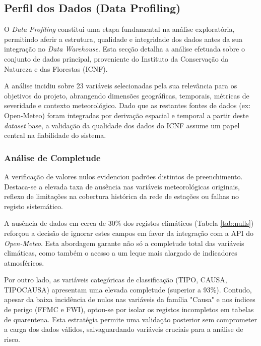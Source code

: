 \subsection{Perfil dos Dados (Data Profiling)}
\label{subsec:data_profiling}

O \textit{Data Profiling} constitui uma etapa fundamental na análise exploratória, permitindo aferir a estrutura, qualidade e integridade dos dados antes da sua integração no \textit{Data Warehouse}. Esta secção detalha a análise efetuada sobre o conjunto de dados principal, proveniente do Instituto da Conservação da Natureza e das Florestas (ICNF).

A análise incidiu sobre 23 variáveis selecionadas pela sua relevância para os objetivos do projeto, abrangendo dimensões geográficas, temporais, métricas de severidade e contexto meteorológico. Dado que as restantes fontes de dados (ex: Open-Meteo) foram integradas por derivação espacial e temporal a partir deste \textit{dataset} base, a validação da qualidade dos dados do ICNF assume um papel central na fiabilidade do sistema.

\subsubsection{Análise de Completude}
A verificação de valores nulos evidenciou padrões distintos de preenchimento. Destaca-se a elevada taxa de ausência nas variáveis meteorológicas originais, reflexo de limitações na cobertura histórica da rede de estações ou falhas no registo sistemático.

A ausência de dados em cerca de 30\% dos registos climáticos (Tabela \ref{tab:nulls}) reforçou a decisão de ignorar estes campos em favor da integração com a API do \textit{Open-Meteo}. Esta abordagem garante não só a completude total das variáveis climáticas, como também o acesso a um leque mais alargado de indicadores atmosféricos.

Por outro lado, as variáveis categóricas de classificação (TIPO, CAUSA, TIPOCAUSA) apresentam uma elevada completude (superior a 93\%). Contudo, apesar da baixa incidência de nulos nas variáveis da família "Causa" e nos índices de perigo (FFMC e FWI), optou-se por isolar os registos incompletos em tabelas de quarentena. Esta estratégia permite uma validação posterior sem comprometer a carga dos dados válidos, salvaguardando variáveis cruciais para a análise de risco.


